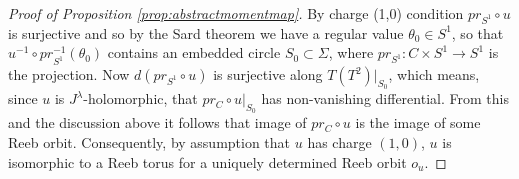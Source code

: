 \documentclass{amsart}
\numberwithin{equation}{section}
\theoremstyle{definition}
\theoremstyle{remark}
\begin{document}
\begin{proof}[Proof of Proposition \ref{prop:abstractmomentmap}]
   By charge (1,0) condition  $pr _{S ^{1} } \circ u $ is surjective and so by the Sard theorem we have a regular value $\theta _{0} \in S ^{1}   $, so that 
$ u ^{-1} \circ pr _{S ^{1} } ^{-1}  (\theta  _{0}) $ contains  an
embedded circle  $S _{0} \subset \Sigma $, where $pr _{S ^{1} }: C \times S ^{1} \to S ^{1}   $ is the projection.
Now $d (pr _{S ^{1} } \circ u )$ is surjective along 
$T (T ^{2} )| _{S _{0} } $, which means, since $u$ is $J ^{\lambda}
$-holomorphic, that $pr _{C} \circ u| _{S _{0}   } $ has non-vanishing differential.
From this and the discussion above it follows that image of $pr _{C }
\circ u $ is the image of some Reeb orbit. Consequently, by assumption that $u$ has charge $(1,0)$, $u$ is isomorphic to a Reeb torus for a uniquely determined Reeb orbit $o _{u} $.
%




\end{proof}
\end{document}
